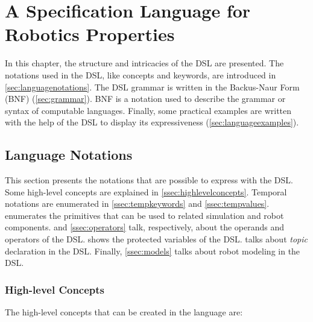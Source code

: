 \chapter{A Specification Language for Robotics Properties}
\label{chap:language}

In this chapter, the structure and intricacies of the DSL are presented. The notations used in the DSL, like concepts and keywords, are introduced in \autoref{sec:languagenotations}. The DSL grammar is written in the Backus-Naur Form (BNF) (\autoref{sec:grammar}). BNF is a notation used to describe the grammar or syntax of computable languages. Finally, some practical examples are written with the help of the DSL to display its expressiveness (\autoref{sec:languageexamples}).


\section{Language Notations}
\label{sec:languagenotations}

This section presents the notations that are possible to express with the DSL. Some high-level concepts are explained in \autoref{ssec:highlevelconcepts}. Temporal notations are enumerated in \autoref{ssec:tempkeywords} and \autoref{ssec:tempvalues}.  enumerates the primitives that can be used to related simulation and robot components.  and \autoref{ssec:operators} talk, respectively, about the operands and operators of the DSL.  shows the protected variables of the DSL.  talks about \textit{topic} declaration in the DSL. Finally, \autoref{ssec:models} talks about robot modeling in the DSL.

\subsection{High-level Concepts}
\label{ssec:highlevelconcepts}

The high-level concepts that can be created in the language are:


